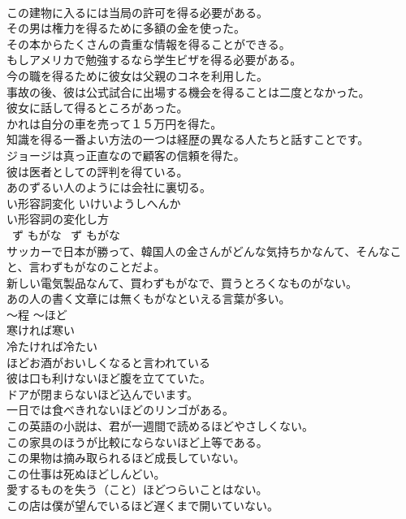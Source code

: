 \documentclass[8pt]{extreport}
\begin{document}
\begin{CJK}{UTF8}{min}
\\	この建物に入るには当局の許可を得る必要がある。  
\\	その男は権力を得るために多額の金を使った。  
\\	その本からたくさんの貴重な情報を得ることができる。  
\\	もしアメリカで勉強するなら学生ビザを得る必要がある。  
\\	今の職を得るために彼女は父親のコネを利用した。  
\\	事故の後、彼は公式試合に出場する機会を得ることは二度となかった。  
\\	彼女に話して得るところがあった。  
\\	かれは自分の車を売って１５万円を得た。  
\\	知識を得る一番よい方法の一つは経歴の異なる人たちと話すことです。  
\\	ジョージは真っ正直なので顧客の信頼を得た。  
\\	彼は医者としての評判を得ている。   
\\	あのずるい人のようには会社に裏切る。   
\\	い形容詞変化	いけいようしへんか	
\\	い形容詞の変化し方
\\	~ず もがな	~ず もがな	
\\	サッカーで日本が勝って、韓国人の金さんがどんな気持ちかなんて、そんなこと、言わずもがなのことだよ。  
\\	新しい電気製品なんて、買わずもがなで、買うとろくなものがない。  
\\	あの人の書く文章には無くもがなといえる言葉が多い。  
\\	〜程	〜ほど	
\\	寒ければ寒い
\\	冷たければ冷たい
\\	ほどお酒がおいしくなると言われている  
\\	彼は口も利けないほど腹を立てていた。  
\\	ドアが閉まらないほど込んでいます。  
\\	一日では食べきれないほどのリンゴがある。  
\\	この英語の小説は、君が一週間で読めるほどやさしくない。  
\\	この家具のほうが比較にならないほど上等である。  
\\	この果物は摘み取られるほど成長していない。  
\\	この仕事は死ぬほどしんどい。  
\\	愛するものを失う（こと）ほどつらいことはない。  
\\	この店は僕が望んでいるほど遅くまで開いていない。  

\end{CJK}
\end{document}
